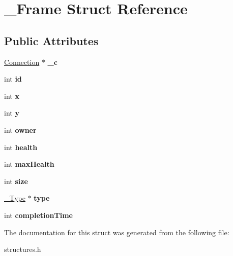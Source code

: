 \hypertarget{struct__Frame}{
\section{\_\-Frame Struct Reference}
\label{struct__Frame}
}
\subsection*{Public Attributes}
\begin{DoxyCompactItemize}
\item 
\hypertarget{struct__Frame_a85d8d05ce9f31edc328c1bf12f1aaccd}{
\hyperlink{structConnection}{Connection} $\ast$ {\bfseries \_\-c}}
\label{struct__Frame_a85d8d05ce9f31edc328c1bf12f1aaccd}

\item 
\hypertarget{struct__Frame_a625f3af04536d2e0f493c05fac69846a}{
int {\bfseries id}}
\label{struct__Frame_a625f3af04536d2e0f493c05fac69846a}

\item 
\hypertarget{struct__Frame_ac14551c123b762ce73d9a616f5c91195}{
int {\bfseries x}}
\label{struct__Frame_ac14551c123b762ce73d9a616f5c91195}

\item 
\hypertarget{struct__Frame_a32484dd5600487febf8c3585ad85ff56}{
int {\bfseries y}}
\label{struct__Frame_a32484dd5600487febf8c3585ad85ff56}

\item 
\hypertarget{struct__Frame_a2d16e0cb9efa4fe4e5ce5d65db47bfa5}{
int {\bfseries owner}}
\label{struct__Frame_a2d16e0cb9efa4fe4e5ce5d65db47bfa5}

\item 
\hypertarget{struct__Frame_ae72a3ac0ec1416c7902faf59e8a4047e}{
int {\bfseries health}}
\label{struct__Frame_ae72a3ac0ec1416c7902faf59e8a4047e}

\item 
\hypertarget{struct__Frame_a86d50983f8ff48141bde8859bdf09b42}{
int {\bfseries maxHealth}}
\label{struct__Frame_a86d50983f8ff48141bde8859bdf09b42}

\item 
\hypertarget{struct__Frame_a5b892f0794b3fe35e65708e3a03e4985}{
int {\bfseries size}}
\label{struct__Frame_a5b892f0794b3fe35e65708e3a03e4985}

\item 
\hypertarget{struct__Frame_a80a067fe44266acfb51000098e58d797}{
\hyperlink{struct__Type}{\_\-Type} $\ast$ {\bfseries type}}
\label{struct__Frame_a80a067fe44266acfb51000098e58d797}

\item 
\hypertarget{struct__Frame_adfad76a0dd5a9621664c3f2622ee2c6b}{
int {\bfseries completionTime}}
\label{struct__Frame_adfad76a0dd5a9621664c3f2622ee2c6b}

\end{DoxyCompactItemize}


The documentation for this struct was generated from the following file:\begin{DoxyCompactItemize}
\item 
structures.h\end{DoxyCompactItemize}
